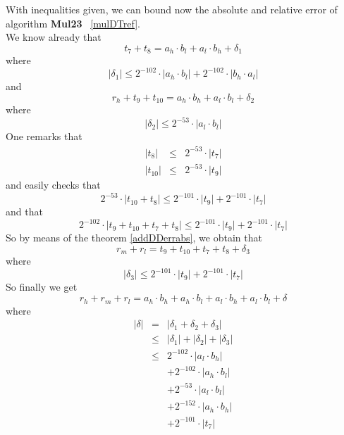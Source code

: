 \documentclass[a4paper,10pt,twoside]{article}
\newenvironment{proof}[1][Proof]{\begin{trivlist}
\item[\hskip \labelsep {\bfseries #1}]}{\end{trivlist}}
\newcommand{\hi}{\ensuremath{\mathit{h}}}
\newcommand{\mi}{\ensuremath{\mathit{m}}}
\newcommand{\lo}{\ensuremath{\mathit{l}}}
\newcommand{\MulDT}{{\bf Mul23}}
\begin{document}
\begin{proof}
With inequalities given, we can bound now the absolute and relative error of algorithm \MulDT~ \ref{mulDTref}. \\
We know already that
$$t_7 + t_8 = a_\hi \cdot b_\lo + a_\lo \cdot b_\hi + \delta_1$$
where
$$\left \vert \delta_1 \right \vert \leq 2^{-102} \cdot \left \vert a_\hi \cdot b_\lo \right \vert + 
                                         2^{-102} \cdot \left \vert b_\hi \cdot a_\lo \right \vert$$
and
$$r_\hi + t_9 + t_{10} = a_\hi \cdot b_\hi + a_\lo \cdot b_\lo + \delta_2$$
where
$$\left \vert \delta_2 \right \vert \leq 2^{-53} \cdot \left \vert a_\lo \cdot b_\lo \right \vert$$
One remarks that
\begin{eqnarray*}
\left \vert t_8 \right \vert & \leq & 2^{-53} \cdot \left \vert t_7 \right \vert \\
\left \vert t_{10} \right \vert & \leq & 2^{-53} \cdot \left \vert t_9 \right \vert 
\end{eqnarray*}
and easily checks that
$$2^{-53} \cdot \left \vert t_{10} + t_8 \right \vert \leq 2^{-101} \cdot \left \vert t_9 \right \vert + 2^{-101} \cdot \left \vert t_7 \right \vert$$
and that
$$2^{-102} \cdot \left \vert t_9 + t_{10} + t_7 + t_8 \right \vert \leq 2^{-101} \cdot \left \vert t_9 \right \vert + 
                                                                        2^{-101} \cdot \left \vert t_7 \right \vert$$
So by means of the theorem \ref{addDDerrabs}, we obtain that
$$r_\mi + r_\lo = t_9 + t_{10} + t_7 + t_8 + \delta_3$$
where
$$\left \vert \delta_3 \right \vert \leq 2^{-101} \cdot \left \vert t_9 \right \vert + 2^{-101} \cdot \left \vert t_7 \right \vert$$
So finally we get 
$$r_\hi + r_\mi + r_\lo = a_\hi \cdot b_\hi + a_\hi \cdot b_\lo + a_\lo \cdot b_\hi + a_\lo \cdot b_\lo + \delta$$
where
\begin{eqnarray*}
\left \vert \delta \right \vert & = & \left \vert \delta_1 + \delta_2 + \delta_3 \right \vert \\
& \leq & \left \vert \delta_1 \right \vert + \left \vert \delta_2 \right \vert + \left \vert \delta_3 \right \vert \\
& \leq & 2^{-102} \cdot \left \vert a_\lo \cdot b_\hi \right \vert \\
& & + 2^{-102} \cdot \left \vert a_\hi \cdot b_\lo \right \vert \\
& & + 2^{-53} \cdot \left \vert a_\lo \cdot b_\lo \right \vert \\
& & + 2^{-152} \cdot \left \vert a_\hi \cdot b_\hi \right \vert \\
& & + 2^{-101} \cdot \left \vert t_7 \right \vert

\end{eqnarray*}
\end{proof}
\end{document}
